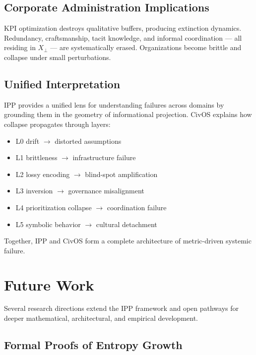 \documentclass[11pt]{article}
\begin{document}
\subsection{Corporate Administration Implications}

KPI optimization destroys qualitative buffers, producing extinction dynamics.
Redundancy, craftsmanship, tacit knowledge, and informal coordination --- all residing in $X_{\perp}$ --- are systematically erased.
Organizations become brittle and collapse under small perturbations.

\subsection{Unified Interpretation}

IPP provides a unified lens for understanding failures across domains by grounding them in the geometry of informational projection.
CivOS explains how collapse propagates through layers:

\begin{itemize}[leftmargin=1.5em]
    \item L0 drift $\rightarrow$ distorted assumptions
    \item L1 brittleness $\rightarrow$ infrastructure failure
    \item L2 lossy encoding $\rightarrow$ blind-spot amplification
    \item L3 inversion $\rightarrow$ governance misalignment
    \item L4 prioritization collapse $\rightarrow$ coordination failure
    \item L5 symbolic behavior $\rightarrow$ cultural detachment
\end{itemize}

Together, IPP and CivOS form a complete architecture of metric-driven systemic failure.

\section{Future Work}

Several research directions extend the IPP framework and open pathways for deeper mathematical, architectural, and empirical development.

\subsection{Formal Proofs of Entropy Growth}
\end{document}
